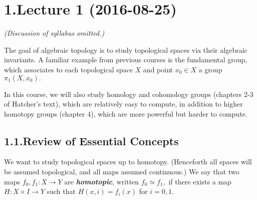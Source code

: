 \documentclass{article}
\begin{document}
\newcommand{\R}{\mathbb{R}}
\renewcommand{\C}{\mathbb{C}}
\newcommand{\Z}{\mathbb{Z}}
\newcommand{\id}{\operatorname{id}}
\newcommand{\im}{\operatorname{im}}
\newcommand{\pt}{\operatorname{pt}}
\mdxtitleblockstart{}

\mdxauthorstart{}
\mdxauthorend\mdtitleauthorrunning{}{}\mdxtitleblockend%

\section{1.\hspace*{0.5em}Lecture 1 (2016-08-25)}\label{sec-lecture-1-2016-08-25}%

\noindent{}\emph{(Discussion of syllabus omitted.)}%

The goal of algebraic topology is to study topological spaces via their algebraic invariants. A familiar example from previous courses is the fundamental group, which associates to each topological space $X$ and point $x_0 \in X$ a group $\pi_1(X, x_0).$%

In this course, we will also study homology and cohomology groups  (chapters 2-3 of Hatcher's text), which are relatively easy to compute, in addition to higher homotopy groups (chapter 4), which are more powerful but harder to compute.%

\subsection{1.1.\hspace*{0.5em}Review of Essential Concepts}\label{sec-review-of-essential-concepts}%

\noindent{}We want to study topological spaces up to homotopy. (Henceforth all spaces will be assumed topological, and all maps assumed continuous.) We say that two maps $f_0, f_1: X \to Y$ are \textbf{\emph{homotopic}}, written $f_0 \simeq f_1,$ if there exists a map $H: X \times I \to Y$ such that $H(x,i) = f_i(x)$ for $i = 0,1.$%
\end{document}
